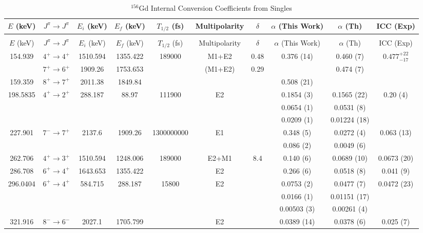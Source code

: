\begin{landscape}
    \begin{longtable}{c|c|c|c|c|c|c|c|c|c}
    \caption{$^{156}$Gd Internal Conversion Coefficients from Singles}
        \label{tab:156Gd_Single_ICC}\\
    \toprule
$E$ (keV)	&	$J^{\pi}	\rightarrow	J^{\pi}$	&	$E_i$ (keV)	&	$E_f$ (keV)	&	$T_{1/2}$ (fs)	&	Multipolarity	&	$\delta$	&	$\alpha$ (This Work)	&	$\alpha$  (Th)	&	ICC (Exp)	\\
\hline		
\endfirsthead
    \caption[]{$^{156}$Gd Internal Conversion Coefficients from Singles}\\
    \toprule
$E$ (keV)	&	$J^{\pi}	\rightarrow	J^{\pi}$	&	$E_i$ (keV)	&	$E_f$ (keV)	&	$T_{1/2}$ (fs)	&	Multipolarity	&	$\delta$	&	$\alpha$ (This Work)	&	$\alpha$  (Th)	&	ICC (Exp)	\\
\hline		
\endhead
154.939	&	$4^+	\rightarrow	4^+$	&	1510.594	&	1355.422	&	189000	&	M1+E2	&	0.48	&	0.376 (14)	&	0.460 (7)	&	$0.477_{-17}^{+22}$	\\
	&	$7^+	\rightarrow	6^+$	&	1909.26	&	1753.653	&		&	(M1+E2)	&	0.29	&		&	0.474 (7)	&		\\
159.359	&	$8^+	\rightarrow	7^+$	&	2011.38	&	1849.84	&		&		&		&	0.508 (21)	&		&		\\
198.5835	&	$4^+	\rightarrow	2^+$	&	288.187	&	88.97	&	111900	&	E2	&		&	0.1854 (3)	&	0.1565 (22)	&	0.20 (4)	\\
	&				&		&		&		&		&		&	0.0654 (1)	&	0.0531 (8)	&		\\
	&			&		&		&		&		&		&	0.0209 (1)	&	0.01224 (18)	&		\\
227.901	&	$7^-	\rightarrow 7^+$	&	2137.6	&	1909.26	&	1300000000	&	E1	&		&	0.348 (5)	&	0.0272 (4)	&	0.063 (13)	\\
	&			&		&		&		&		&		&	0.086 (2)	&	0.0049 (6)	&		\\
262.706	&	$4^+	\rightarrow	3^+$	&	1510.594	&	1248.006	&	189000	&	E2+M1	&	8.4	&	0.140 (6)	&	0.0689 (10)	&	0.0673 (20)	\\
286.708	&	$6^+	\rightarrow	4^+$	&	1643.653	&	1355.422	&		&	E2	&		&	0.266 (6)	&	0.0518 (8)	&	0.041 (9)	\\
296.0404	&	$6^+	\rightarrow	4^+$	&	584.715	&	288.187	&	15800	&	E2	&		&	0.0753 (2)	&	0.0477 (7)	&	0.0472 (23)	\\
	&				&		&		&		&		&		&	0.0166 (1)	&	0.01151 (17)	&		\\
	&				&		&		&		&		&		&	0.00503 (3)	&	0.00261 (4)	&		\\
321.916	&	$8^-	\rightarrow	6^-$	&	2027.1	&	1705.799	&		&	E2	&		&	0.0389 (14)	&	0.0378 (6)	&	0.025 (7)	\\

\end{longtable}
\end{landscape}

